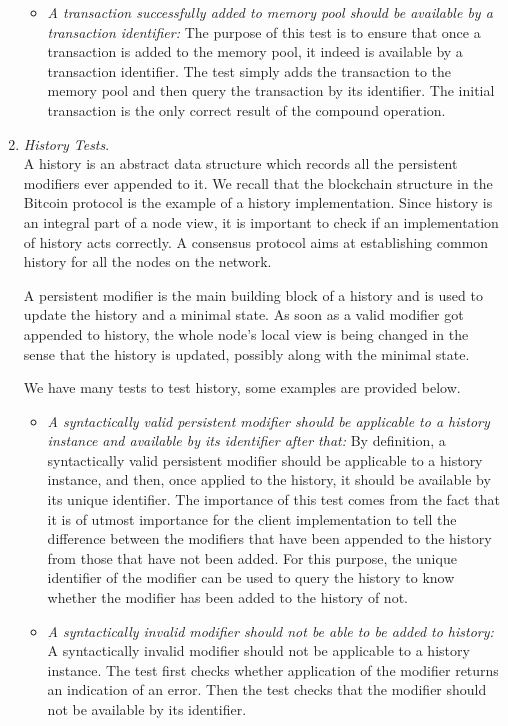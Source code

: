 \begin{enumerate}[\IEEEsetlabelwidth{Z}]
\begin{itemize}[]
\item \textit{A transaction successfully added to memory pool should be available by a transaction identifier:} The purpose of this test is to ensure that once a transaction is added to the memory pool, it indeed is available by a transaction identifier. The test simply adds the transaction to the memory pool and then query the transaction by its identifier. The initial transaction is the only correct result of the compound operation. \\
\end{itemize}
\item \textit{History Tests}.\\
A history is an abstract data structure which records all the persistent modifiers ever appended to it. We recall that the blockchain structure in the Bitcoin protocol is the example of a history implementation. Since history is an integral part of a node view, it is important to check if an implementation of history acts correctly. A consensus protocol aims at establishing common history for all the nodes on the network.

A persistent modifier is the main building block of a history and is used to update the history and a minimal state. As soon as a valid modifier got appended to history, the whole node's local view is being changed in the sense that the history is updated, possibly along with the minimal state.

We have many tests to test history, some examples are provided below.

\begin{itemize}[]
\item \textit{A syntactically valid persistent modifier should be applicable to a history instance and available by its identifier after that:} By definition, a syntactically valid persistent modifier should be applicable to a history instance, and then, once applied to the history, it should be available by its unique identifier. The importance of this test comes from the fact that it is of utmost importance for the client implementation to tell the difference between the modifiers that have been appended to the history from those that have not been added. For this purpose, the unique identifier of the modifier can be used to query the history to know whether the modifier has been added to the history of not.\\

\item \textit{A syntactically invalid modifier should not be able to be added to history:} A syntactically invalid modifier should not be applicable to a history instance. The test first checks whether application of the modifier returns an indication of an error. Then the test checks that the modifier should not be available by its identifier.\\


\end{itemize}
\end{enumerate}
